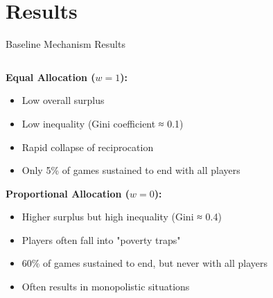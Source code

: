 \documentclass[aspectratio=169]{beamer} %
\begin{document}
\section{Results}

\begin{frame}{Baseline Mechanism Results}
\begin{columns}
\begin{column}{0.6\textwidth}
\textbf{Equal Allocation ($w = 1$):}
\begin{itemize}
    \item Low overall surplus
    \item Low inequality (Gini coefficient ≈ 0.1)
    \item Rapid collapse of reciprocation
    \item Only 5\% of games sustained to end with all players
\end{itemize}

\textbf{Proportional Allocation ($w = 0$):}
\begin{itemize}
    \item Higher surplus but high inequality (Gini ≈ 0.4)
    \item Players often fall into "poverty traps"
    \item 60\% of games sustained to end, but never with all players
    \item Often results in monopolistic situations
\end{itemize}
\end{column}
\begin{column}{0.4\textwidth}
\begin{center}
\end{center}
\end{column}
\end{columns}
\end{frame}
\end{document}

